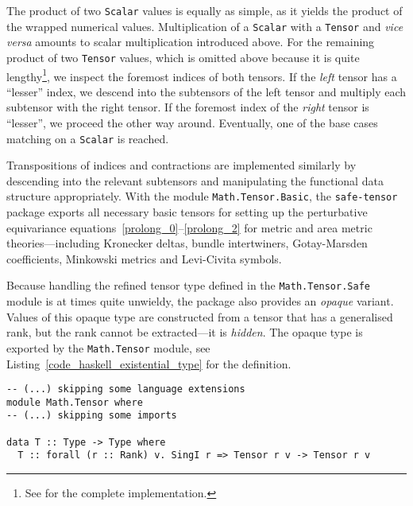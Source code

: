 The product of two \texttt{Scalar} values is equally as simple, as it yields the product of the wrapped numerical values. Multiplication of a \texttt{Scalar} with a \texttt{Tensor} and \emph{vice versa} amounts to scalar multiplication introduced above. For the remaining product of two \texttt{Tensor} values, which is omitted above because it is quite lengthy\footnote{See \cite{Alex_2020_safe-tensor} for the complete implementation.}, we inspect the foremost indices of both tensors. If the \emph{left} tensor has a ``lesser'' index, we descend into the subtensors of the left tensor and multiply each subtensor with the right tensor. If the foremost index of the \emph{right} tensor is ``lesser'', we proceed the other way around. Eventually, one of the base cases matching on a \texttt{Scalar} is reached.

Transpositions of indices and contractions are implemented similarly by descending into the relevant subtensors and manipulating the functional data structure appropriately. With the module \texttt{Math.Tensor.Basic}, the \texttt{safe-tensor} package exports all necessary basic tensors for setting up the perturbative equivariance equations~\ref{prolong_0}--\ref{prolong_2} for metric and area metric theories---including Kronecker deltas, bundle intertwiners, Gotay-Marsden coefficients, Minkowski metrics and Levi-Civita symbols.

Because handling the refined tensor type defined in the \texttt{Math.Tensor.Safe} module is at times quite unwieldy, the package also provides an \emph{opaque} variant. Values of this opaque type are constructed from a tensor that has a generalised rank, but the rank cannot be extracted---it is \emph{hidden}. The opaque type is exported by the \texttt{Math.Tensor} module, see Listing~\ref{code_haskell_existential_type} for the definition.

\begin{code}
  \begin{verbatim}
-- (...) skipping some language extensions
module Math.Tensor where
-- (...) skipping some imports

data T :: Type -> Type where
  T :: forall (r :: Rank) v. SingI r => Tensor r v -> Tensor r v
  \end{verbatim}
  \label{code_haskell_existential_type}
\end{code}

